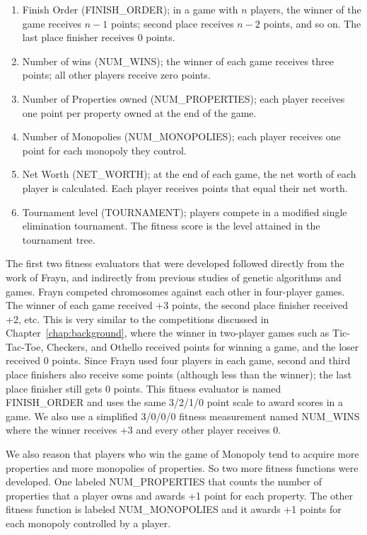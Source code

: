 \begin{enumerate}
  \item {Finish Order (FINISH\_ORDER); in a game with \(n\) players, the winner
  of the game receives \(n-1\) points; second place receives \(n-2\) points, and
  so on. The last place finisher receives 0 points.}
  \item {Number of wins (NUM\_WINS); the winner of each game receives three
  points; all other players receive zero points.}
  \item {Number of Properties owned (NUM\_PROPERTIES); each player receives one
  point per property owned at the end of the game.}
  \item {Number of Monopolies (NUM\_MONOPOLIES); each player receives one
  point for each monopoly they control.}
  \item {Net Worth (NET\_WORTH); at the end of each game, the net worth of each
  player is calculated. Each player receives points that equal their net
  worth.}
  \item {Tournament level (TOURNAMENT); players compete in a modified single
  elimination tournament. The fitness score is the level attained in the
  tournament tree.}
\end{enumerate}

The first two fitness evaluators that were developed followed directly from
the work of Frayn, and indirectly from previous studies of genetic
algorithms and games. Frayn competed chromosomes against each other in
four-player games. The winner of each game received +3 points, the second place
finisher received +2, etc. This is very similar to the competitions discussed in
Chapter~\ref{chap:background}, where the winner in two-player games such as
Tic-Tac-Toe, Checkers, and Othello received points for winning a game, and the
loser received 0 points. Since Frayn used four players in each game, second and
third place finishers also receive some points (although less than the winner);
the last place finisher still gets 0 points. This fitness evaluator is named
FINISH\_ORDER and uses the same 3/2/1/0 point scale to award scores in a game.
We also use a simplified 3/0/0/0 fitness measurement named NUM\_WINS where the
winner receives +3 and every other player receives 0.

We also reason that players who win the game of Monopoly tend to acquire more
properties and more monopolies of properties. So two more fitness functions were
developed. One labeled NUM\_PROPERTIES that counts the number of properties that
a player owns and awards +1 point for each property. The other fitness function
is labeled NUM\_MONOPOLIES and it awards +1 points for each monopoly controlled
by a player.

